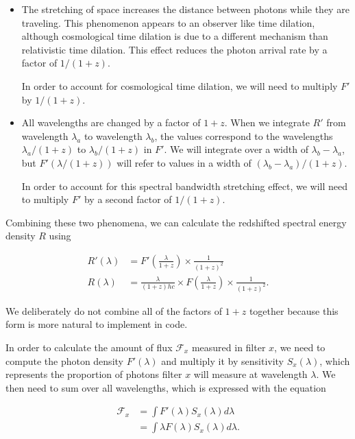 \documentclass[linenumbers]{aastex631}
\begin{document}
\begin{itemize}
  \item The stretching of space increases the distance between photons while
  they are traveling. This phenomenon appears to an observer like time
  dilation, although cosmological time dilation is due to a different mechanism
  than relativistic time dilation. This effect reduces the photon arrival rate
  by a factor of $1/(1+z)$.

  In order to account for cosmological time dilation, we will need to multiply
  $F'$ by $1/(1+z)$.

  \item All wavelengths are changed by a factor of $1 + z$. When we integrate
  $R'$ from wavelength $\lambda_a$ to wavelength $\lambda_b$, the values
  correspond to the wavelengths $\lambda_a / (1+z)$ to $\lambda_b / (1+z)$ in
  $F'$. We will integrate over a width of $\lambda_b - \lambda_a$, but
  $F'(\lambda / (1+z))$ will refer to values in a width of
  $(\lambda_b - \lambda_a) / (1+z)$.

  In order to account for this spectral bandwidth stretching effect, we will need
  to multiply $F'$ by a second factor of $1/(1+z)$.
\end{itemize}

Combining these two phenomena, we can calculate the redshifted spectral energy
density $R$ using

\begin{equation}
\begin{aligned}
\label{eq:redshifted_density}
  R'(\lambda) &= F'\left(\frac{\lambda}{1+z}\right) \times \frac{1}{(1 + z)^2} \\
  R(\lambda) &= \frac{\lambda}{(1+z)hc} \times F\left(\frac{\lambda}{1+z}\right) \times \frac{1}{(1 + z)^2} .
\end{aligned}
\end{equation}

We deliberately do not combine all of the factors of $1+z$ together because
this form is more natural to implement in code.

In order to calculate the amount of flux $\mathcal{F}_x$ measured in filter
$x$, we need to compute the photon density $F'(\lambda)$ and multiply it by
sensitivity $S_x(\lambda)$, which represents the proportion of photons filter $x$
will measure at wavelength $\lambda$. We then need to sum over all wavelengths,
which is expressed with the equation

\begin{equation}
\begin{aligned}
\label{eq:flux_definition}
  \mathcal{F}_x &= \int F'(\lambda) S_x(\lambda) d\lambda \\
                &= \int \lambda F(\lambda) S_x(\lambda) d\lambda.
\end{aligned}
\end{equation}
\end{document}
